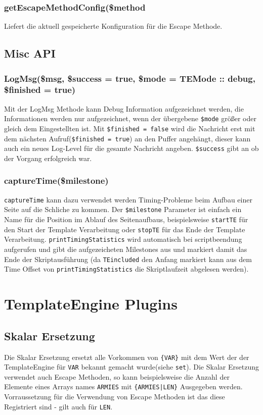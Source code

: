 \documentclass[a4paper,10pt]{article}
\begin{document}
\subsubsection{getEscapeMethodConfig(\$method}
Liefert die aktuell gespeicherte Konfiguration f\"ur die Escape Methode.

\subsection{Misc API}

\subsubsection{LogMsg(\$msg, \$success = true, \$mode = TEMode :: debug, \$finished = true)}
Mit der LogMsg Methode kann Debug Information aufgezeichnet werden, die Informationen werden nur aufgezeichnet, wenn
der \"ubergebene {\tt \$mode} gr\"o\ss{}er oder gleich dem Eingestellten ist. Mit {\tt \$finished = false} wird die Nachricht
erst mit dem n\"achsten Aufruf({\tt \$finished = true}) an den Puffer angeh\"angt, dieser kann auch ein neues Log-Level f\"ur
die gesamte Nachricht angeben. {\tt \$success} gibt an ob der Vorgang erfolgreich war.

\subsubsection{captureTime(\$milestone)}
{\tt captureTime} kann dazu verwendet werden Timing-Probleme beim Aufbau einer Seite auf die Schliche zu kommen.
Der {\tt \$milestone} Parameter ist einfach ein Name f\"ur die Position im Ablauf des Seitenaufbaus,
beispielsweise {\tt startTE} f\"ur den Start der Template Verarbeitung oder {\tt stopTE} f\"ur das Ende der
Template Verarbeitung. {\tt printTimingStatistics} wird automatisch bei scriptbeendung aufgerufen und gibt die aufgezeicheten
Milestones aus und markiert damit das Ende der Skriptausf\"uhrung (da {\tt TEincluded} den Anfang markiert kann aus
dem Time Offset von {\tt printTimingStatistics} die Skriptlaufzeit abgelesen werden).

\section{TemplateEngine Plugins}

\subsection{Skalar Ersetzung}
Die Skalar Ersetzung ersetzt alle Vorkommen von {\tt \{VAR\}} mit dem Wert der der TemplateEngine f\"ur {\tt VAR} bekannt
gemacht wurde(siehe {\tt set}). Die Skalar Ersetzung verwendet auch Escape Methoden, so kann beispielsweise die Anzahl
der Elemente eines Arrays names {\tt ARMIES} mit {\tt \{ARMIES|LEN\}} Ausgegeben werden. Vorraussetzung f\"ur die
Verwendung von Escape Methoden ist das diese Registriert sind - gilt auch f\"ur {\tt LEN}.
\end{document}
